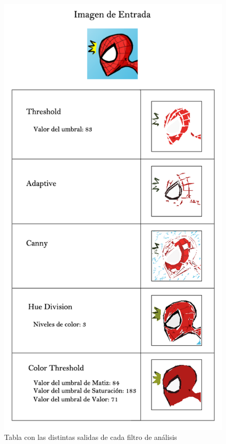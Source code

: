 			\begin{figure}[htbp]
			\centering
			\hspace*{-0.0in}
			\includegraphics[scale=0.5]{graphics/analresults.png}
			\caption{Tabla con las distintas salidas de cada filtro de análisis}
			\label{fig:analresults}
			\end{figure}
		
